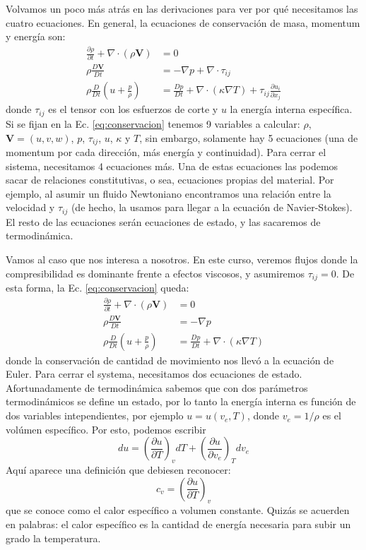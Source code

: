 Volvamos un poco más atrás en las derivaciones para ver por qué necesitamos las cuatro ecuaciones.
En general, la ecuaciones de conservación de masa, momentum y energía son:
%
\begin{align}\label{eq:conservacion}
\frac{\partial\rho}{\partial t} + \nabla\cdot(\rho\mathbf{V})&=0\nonumber\\
\rho\frac{D\mathbf{V}}{Dt} &= -\nabla p + \nabla\cdot\tau_{ij}\nonumber\\
\rho\frac{D}{Dt}\left(u+\frac{p}{\rho}\right) &= \frac{Dp}{Dt}+\nabla\cdot(\kappa\nabla T) + \tau_{ij}\frac{\partial u_i}{\partial x_j}
\end{align}
%
donde $\tau_{ij}$ es el tensor con los esfuerzos de corte y $u$ la energía interna específica.
Si se fijan en la Ec. \eqref{eq:conservacion} tenemos 9 variables a calcular: $\rho$, $\mathbf{V}=(u,v,w)$, $p$, $\tau_{ij}$, $u$, $\kappa$ y $T$, sin embargo, solamente hay 5 ecuaciones (una de momentum por cada dirección, más energía y continuidad).
Para cerrar el sistema, necesitamos 4 ecuaciones más.
Una de estas ecuaciones las podemos sacar de relaciones constitutivas, o sea, ecuaciones propias del material. 
Por ejemplo, al asumir un fluido Newtoniano encontramos una relación entre la velocidad y $\tau_{ij}$ (de hecho, la usamos para llegar a la ecuación de Navier-Stokes).
El resto de las ecuaciones serán ecuaciones de estado, y las sacaremos de termodinámica.

Vamos al caso que nos interesa a nosotros.
En este curso, veremos flujos donde la compresibilidad es dominante frente a efectos viscosos, y asumiremos $\tau_{ij}=0$.
De esta forma, la Ec. \eqref{eq:conservacion} queda:
%
\begin{align}\label{eq:conservacion_novisc}
\frac{\partial\rho}{\partial t} + \nabla\cdot(\rho\mathbf{V})&=0\nonumber\\
\rho\frac{D\mathbf{V}}{Dt} &= -\nabla p \nonumber\\
\rho\frac{D}{Dt}\left(u+\frac{p}{\rho}\right) &= \frac{Dp}{Dt}+\nabla\cdot(\kappa\nabla T) 
\end{align}
%
donde la conservación de cantidad de movimiento nos llevó a la ecuación de Euler.
Para cerrar el systema, necesitamos dos ecuaciones de estado.
Afortunadamente de termodinámica sabemos que con dos parámetros termodinámicos se define un estado, por lo tanto la energía interna es función de dos variables intependientes, por ejemplo $u=u(v_e,T)$, donde $v_e=1/\rho$ es el volúmen específico.
Por esto, podemos escribir
%
\begin{equation}
du = \left(\frac{\partial u}{\partial T}\right)_vdT + \left(\frac{\partial u}{\partial v_e}\right)_Tdv_e
\end{equation}
%
Aquí aparece una definición que debiesen reconocer:
%
\begin{equation}
c_v = \left(\frac{\partial u}{\partial T}\right)_v
\end{equation}
%
que se conoce como el calor específico a volumen constante.
Quizás se acuerden en palabras: el calor específico es la cantidad de energía necesaria para subir un grado la temperatura.
